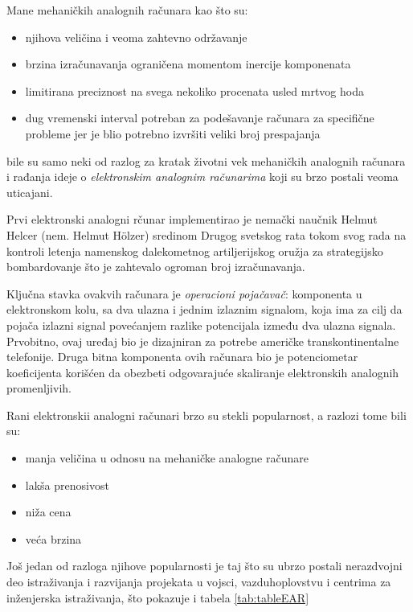 \documentclass[a4paper]{article}
\begin{document}
{		\par Mane mehaničkih analognih računara kao što su:
		\begin{itemize}
			\item njihova veličina i veoma zahtevno održavanje
			\item brzina izračunavanja ograničena momentom inercije komponenata
			\item limitirana preciznost na svega nekoliko procenata usled mrtvog hoda
			\item dug vremenski interval potreban za podešavanje računara za specifične probleme jer je blio potrebno izvršiti veliki broj prespajanja
		\end{itemize}
		bile su samo neki od razlog za kratak životni vek mehaničkih analognih računara i rađanja ideje o \emph{elektronskim analognim računarima} koji su brzo postali veoma uticajani.
		\par Prvi elektronski analogni rčunar implementirao je nemački naučnik Helmut Helcer (nem. Helmut Hölzer) sredinom Drugog svetskog rata tokom svog rada na kontroli letenja namenskog dalekometnog artiljerijskog oružja za strategijsko bombardovanje što je zahtevalo ogroman broj izračunavanja. \cite{Holzer}
		\par Ključna stavka ovakvih računara je \emph{operacioni pojačavač}: komponenta u elektronskom kolu, sa dva ulazna i jednim izlaznim signalom, koja ima za cilj da pojača izlazni signal povećanjem razlike potencijala između dva ulazna signala. Prvobitno, ovaj uređaj bio je dizajniran za potrebe američke transkontinentalne telefonije. Druga bitna komponenta ovih računara bio je potenciometar koeficijenta korišćen da obezbeti odgovarajuće skaliranje elektronskih analognih promenljivih.
		\par Rani elektronskii analogni računari brzo su stekli popularnost, a razlozi tome bili su:
		\begin{itemize}
			\item manja veličina u odnosu na mehaničke analogne računare
			\item lakša prenosivost
			\item niža cena
			\item  veća brzina
		\end{itemize}
		Još jedan od razloga njihove popularnosti je taj što su ubrzo postali nerazdvojni deo istraživanja i razvijanja projekata u vojsci, vazduhoplovstvu i centrima za inženjerska istraživanja, što pokazuje i tabela \ref{tab:tableEAR} \cite{table}
		
}
\end{document}

